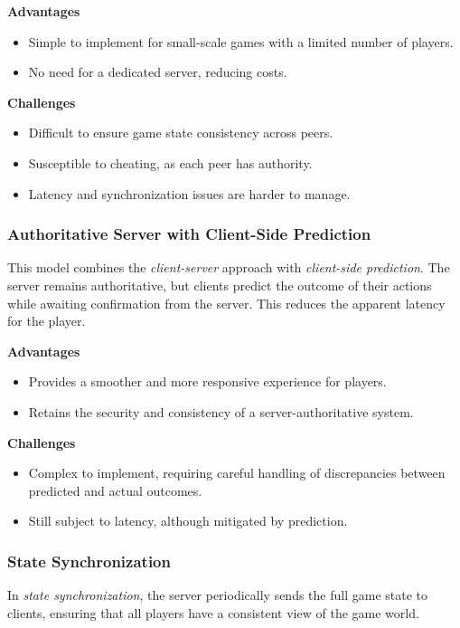 \documentclass{article} %
\begin{document}
\textbf{Advantages}
\begin{itemize}
    \item Simple to implement for small-scale games with a limited number of players.
    \item No need for a dedicated server, reducing costs.
\end{itemize}

\textbf{Challenges}
\begin{itemize}
    \item Difficult to ensure game state consistency across peers.
    \item Susceptible to cheating, as each peer has authority.
    \item Latency and synchronization issues are harder to manage.
\end{itemize}

\subsubsection{Authoritative Server with Client-Side Prediction}
This model combines the \textit{client-server} approach with \textit{client-side prediction}. The server remains authoritative, but clients predict the outcome of their actions while awaiting confirmation from the server. This reduces the apparent latency for the player.

\textbf{Advantages}
\begin{itemize}
    \item Provides a smoother and more responsive experience for players.
    \item Retains the security and consistency of a server-authoritative system.
\end{itemize}

\textbf{Challenges}
\begin{itemize}
    \item Complex to implement, requiring careful handling of discrepancies between predicted and actual outcomes.
    \item Still subject to latency, although mitigated by prediction.
\end{itemize}

\subsubsection{State Synchronization}
In \textit{state synchronization}, the server periodically sends the full game state to clients, ensuring that all players have a consistent view of the game world.
\end{document}
